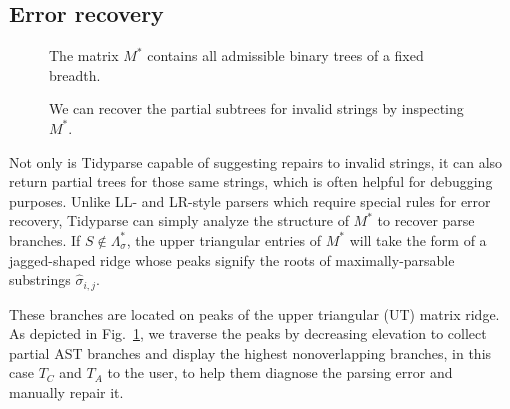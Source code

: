 \documentclass[sigplan,review,anonymous,acmsmall]{acmart}\settopmatter{printfolios=false,printccs=false,printacmref=false}
\begin{document}
\subsection{Error recovery}\label{sec:error_recovery}

\begin{figure}
  \vspace{-20pt}
  \resizebox{0.4\textwidth}{!}{}
  \caption{The matrix $M^*$ contains all admissible binary trees of a fixed breadth.}\label{fig:binary_trees}
  \begin{center}
  \resizebox{.35\textwidth}{!}{}
  \end{center}
  \caption{We can recover the partial subtrees for invalid strings by inspecting $M^*$.}\label{fig:peaks}
\end{figure}

Not only is Tidyparse capable of suggesting repairs to invalid strings, it can also return partial trees for those same strings, which is often helpful for debugging purposes. Unlike LL- and LR-style parsers which require special rules for error recovery, Tidyparse can simply analyze the structure of $M^*$ to recover parse branches. If $S \notin  \Lambda^*_\sigma$, the upper triangular entries of $M^*$ will take the form of a jagged-shaped ridge whose peaks signify the roots of maximally-parsable substrings $\hat{\sigma}_{i, j}$.

These branches are located on peaks of the upper triangular (UT) matrix ridge. As depicted in Fig.~\ref{fig:peaks}, we traverse the peaks by decreasing elevation to collect partial AST branches and display the highest nonoverlapping branches, in this case $T_C$ and $T_A$ to the user, to help them diagnose the parsing error and manually repair it.
\end{document}
